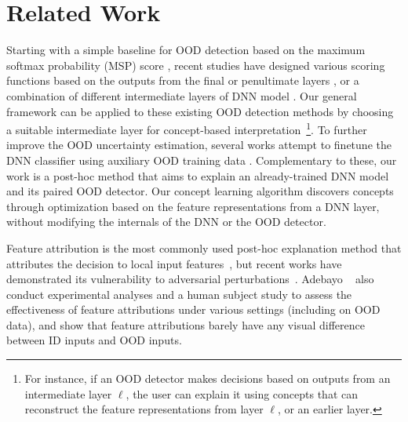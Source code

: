 \section{Related Work}
Starting with a simple baseline for OOD detection based on the maximum softmax probability (MSP) score \cite{hendrycks2016msp}, recent studies have designed various scoring functions based on the outputs from the final or penultimate layers \cite{liang2018ODIN, devries2018learning}, or a combination of different intermediate layers of DNN model \cite{lee2018mahalanobis}.
Our general framework can be applied to these existing OOD detection methods by choosing a suitable intermediate layer for concept-based interpretation~\footnote{For instance, if an OOD detector makes decisions based on outputs from an intermediate layer $\ell$, the user can explain it using concepts that can reconstruct the feature representations from layer $\ell$, or an earlier layer.}.
To further improve the OOD uncertainty estimation, several works attempt to finetune the DNN classifier using auxiliary OOD training data \cite{hendrycks2018OE,lee2018training,chen2021atom}.
Complementary to these, our work is a post-hoc method that aims to explain an already-trained DNN model and its paired OOD detector. 
Our concept learning algorithm discovers concepts through optimization based on the feature representations from a DNN layer, without modifying the internals of the DNN or the OOD detector. 

Feature attribution is the most commonly used post-hoc explanation method that attributes the decision to local input features~\cite{baehrens2009grad, simonyan2013grad, smilkov2017smoothgrad, sundararajan2017IG}, but recent works have demonstrated its vulnerability to \eg adversarial perturbations~\cite{ghorbani2019fragile,heo2019fooling,slack2020fooling}. 
Adebayo \etal~\cite{adebayo2020debugging} also conduct experimental analyses and a human subject study to assess the effectiveness of feature attributions under various settings (including on OOD data), and show that feature attributions barely have any visual difference between ID inputs and OOD inputs.

